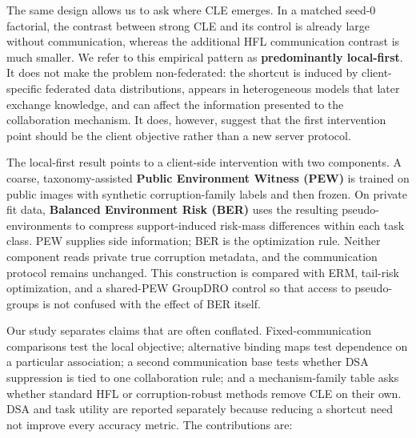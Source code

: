 The same design allows us to ask where CLE emerges. In a matched seed-0 factorial, the contrast between strong CLE and its control is already large without communication, whereas the additional HFL communication contrast is much smaller. We refer to this empirical pattern as \textbf{predominantly local-first}. It does not make the problem non-federated: the shortcut is induced by client-specific federated data distributions, appears in heterogeneous models that later exchange knowledge, and can affect the information presented to the collaboration mechanism. It does, however, suggest that the first intervention point should be the client objective rather than a new server protocol.

The local-first result points to a client-side intervention with two components. A coarse, taxonomy-assisted \textbf{Public Environment Witness (PEW)} is trained on public images with synthetic corruption-family labels and then frozen. On private fit data, \textbf{Balanced Environment Risk (BER)} uses the resulting pseudo-environments to compress support-induced risk-mass differences within each task class. PEW supplies side information; BER is the optimization rule. Neither component reads private true corruption metadata, and the communication protocol remains unchanged. This construction is compared with ERM, tail-risk optimization, and a shared-PEW GroupDRO control so that access to pseudo-groups is not confused with the effect of BER itself.

Our study separates claims that are often conflated. Fixed-communication comparisons test the local objective; alternative binding maps test dependence on a particular association; a second communication base tests whether DSA suppression is tied to one collaboration rule; and a mechanism-family table asks whether standard HFL or corruption-robust methods remove CLE on their own. DSA and task utility are reported separately because reducing a shortcut need not improve every accuracy metric. The contributions are:

